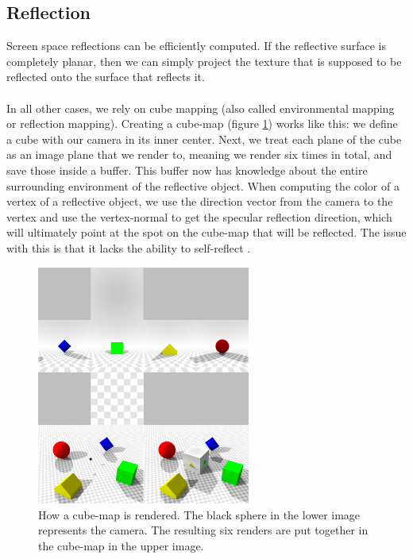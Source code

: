 \documentclass{ACGSeminar}
\begin{document}
	\subsection{Reflection} \label{sec:reflection}
		Screen space reflections can be efficiently computed. If the reflective surface is completely planar, then we can simply project the texture that is supposed to be reflected onto the surface that reflects it. \\\\
		In all other cases, we rely on cube mapping (also called environmental mapping or reflection mapping). Creating a cube-map (figure \ref{fig:cube_map}) works like this: we define a cube with our camera in its inner center. Next, we treat each plane of the cube as an image plane that we render to, meaning we render six times in total, and save those inside a buffer. This buffer now has knowledge about the entire surrounding environment of the reflective object. When computing the color of a vertex of a reflective object, we use the direction vector from the camera to the vertex and use the vertex-normal to get the specular reflection direction, which will ultimately point at the spot on the cube-map that will be reflected. The issue with this is that it lacks the ability to self-reflect \cite{REFL}.
		\begin{figure}[htb!]%
			\begin{center}%
				\includegraphics[width=7cm]{img/cube_map.png}
			\end{center}%
			\caption{How a cube-map is rendered. The black sphere in the lower image represents the camera. The resulting six renders are put together in the cube-map in the upper image.}%
			\label{fig:cube_map}%
		\end{figure}%
\end{document}
